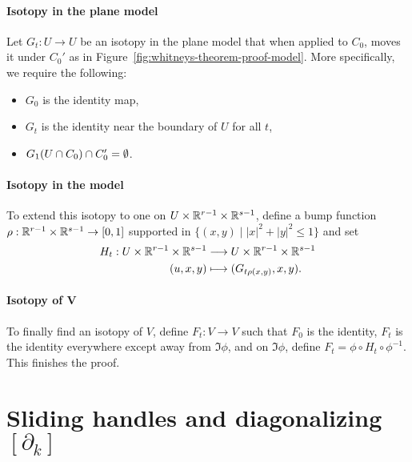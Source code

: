 \begin{myproof}
    \paragraph{Isotopy in the plane model}
    Let $G_t: U \to U$ be an isotopy in the plane model that when applied to $C_0$, moves it under $C_0'$ as in Figure~\ref{fig:whitneys-theorem-proof-model}.
    More specifically, we require the following:
    \begin{itemize}
        \item $G_0$ is the identity map,
        \item $G_t$ is the identity near the boundary of  $U$ for all $t$,
        \item  $ G_1(U \cap C_0) \cap C_0' = \emptyset$.
    \end{itemize}
    \paragraph{Isotopy in the model}
    To extend this isotopy to one on $U \times \mathbb{R}^{r-1} \times \mathbb{R}^{s-1}$, define a bump function $\rho: \mathbb{R}^{r-1}\times \mathbb{R}^{s-1} \to  [0,1]$ supported in $\{(x, y)  \mid |x|^2 + |y|^2 \le  1\}$ and set
    \begin{align*}
        H_t: U \times \mathbb{R}^{r-1}\times \mathbb{R}^{s-1} &\longrightarrow  U \times \mathbb{R}^{r-1} \times \mathbb{R}^{s-1}\\
        (u, x, y) &\longmapsto (G_{t \rho(x, y)}, x, y)
    .\end{align*}
    \paragraph{Isotopy of $\bm{V}$}
    To finally find an isotopy of $V$, define $F_t: V\to V$ such that
    $F_0$ is the identity, $F_t$ is the identity everywhere except away from  $\Im \phi$, and on  $\Im \phi$, define  $F_t = \phi  \circ  H_t  \circ  \phi^{-1}$.
    This finishes the proof.
\end{myproof}

\section{Sliding handles and diagonalizing $[\partial_k]$}

